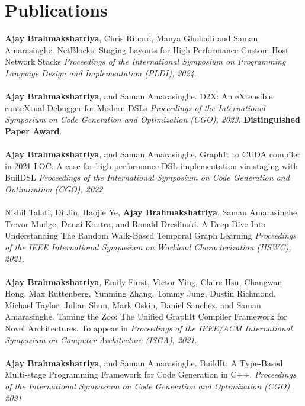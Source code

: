 \documentclass[10pt]{article}
\newcommand{\textbfx}[1]{{\bf #1}}
\newcommand{\textitx}[1]{{\it #1}}
\begin{document}
\section*{Publications}
\textbfx{Ajay Brahmakshatriya}, Chris Rinard, Manya Ghobadi and Saman Amarasinghe. NetBlocks: Staging Layouts for High-Performance Custom Host Network Stacks 
\textitx{Proceedings of the International Symposium on Programming Language Design and Implementation (PLDI), 2024}. 
\\ \\
\textbfx{Ajay Brahmakshatriya}, and Saman Amarasinghe. D2X: An eXtensible conteXtual Debugger for Modern DSLs 
\textitx{Proceedings of the International Symposium on Code Generation and Optimization (CGO), 2023}. \textbfx{Distinguished Paper Award}.
\\ \\
\textbfx{Ajay Brahmakshatriya}, and Saman Amarasinghe. GraphIt to CUDA compiler in 2021 LOC: A case for high-performance DSL implementation via staging with BuilDSL
\textitx{Proceedings of the International Symposium on Code Generation and Optimization (CGO), 2022}.
\\ \\
Nishil Talati, Di Jin, Haojie Ye, \textbf{Ajay Brahmakshatriya}, Saman Amarasinghe, Trevor Mudge, Danai Koutra, and Ronald Dreslinski. A Deep Dive Into Understanding The Random Walk-Based Temporal Graph Learning
\textitx{Proceedings of the IEEE International Symposium on Workload Characterization (IISWC), 2021}.
\\ \\
\textbfx{Ajay Brahmakshatriya}, Emily Furst, Victor Ying, Claire Hsu, Changwan Hong, Max Ruttenberg, Yunming Zhang, Tommy Jung, Dustin Richmond, Michael Taylor, Julian Shun, Mark Oskin, Daniel Sanchez, and Saman Amarasinghe. Taming the Zoo: The Unified GraphIt Compiler Framework for Novel Architectures. To appear in \textitx{Proceedings of the IEEE/ACM International Symposium on Computer Architecture (ISCA), 2021}.
\\ \\
\textbfx{Ajay Brahmakshatriya}, and Saman Amarasinghe. BuildIt: A Type-Based Multi-stage Programming Framework for Code Generation in C++. 
\textitx{Proceedings of the International Symposium on Code Generation and Optimization (CGO), 2021}.
\\ \\
\end{document}
